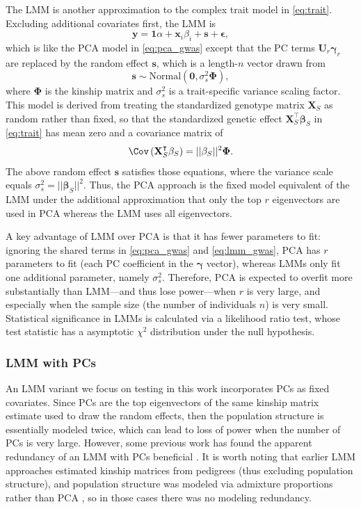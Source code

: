 \documentclass[11pt]{article}
\begin{document}
The LMM is another approximation to the complex trait model in \cref{eq:trait}.
Excluding additional covariates first, the LMM is
\begin{equation}
  \label{eq:lmm_gwas}
  \mathbf{y}
  =
  \mathbf{1} \alpha + \mathbf{x}_i \beta_i + \mathbf{s} + \mathbf{\epsilon}
  ,
\end{equation}
which is like the PCA model in \cref{eq:pca_gwas} except that the PC terms $\mathbf{U}_r \mathbf{\gamma}_r$ are replaced by the random effect $\mathbf{s}$, which is a length-$n$ vector drawn from
$$
\mathbf{s} \sim \text{Normal} \left( \mathbf{0}, \sigma^2_s \mathbf{\Phi} \right),
$$
where $\mathbf{\Phi}$ is the kinship matrix and $\sigma^2_s$ is a trait-specific variance scaling factor.
This model is derived from treating the standardized genotype matrix $\mathbf{X}_S$ as random rather than fixed, so that the standardized genetic effect
$\mathbf{X}_S^\intercal \mathbf{\beta}_S$
in \cref{eq:trait} has mean zero and a covariance matrix of
$$
\Cov \left( \mathbf{X}_S^\intercal \mathbf{\beta}_S \right)
=
|| \mathbf{\beta}_S ||^2 \mathbf{\Phi}
.
$$
The above random effect $\mathbf{s}$ satisfies those equations, where the variance scale equals $\sigma^2_s = || \mathbf{\beta}_S ||^2$.
Thus, the PCA approach is the fixed model equivalent of the LMM under the additional approximation that only the top $r$ eigenvectors are used in PCA whereas the LMM uses all eigenvectors.

A key advantage of LMM over PCA is that it has fewer parameters to fit: ignoring the shared terms in \cref{eq:pca_gwas} and \cref{eq:lmm_gwas}, PCA has $r$ parameters to fit (each PC coefficient in the $\mathbf{\gamma}$ vector), whereas LMMs only fit one additional parameter, namely $\sigma^2_s$.
Therefore, PCA is expected to overfit more substantially than LMM---and thus lose power---when $r$ is very large, and especially when the sample size (the number of individuals $n$) is very small.
Statistical significance in LMMs is calculated via a likelihood ratio test, whose test statistic has a asymptotic $\chi^2$ distribution under the null hypothesis.

\subsubsection{LMM with PCs}

An LMM variant we focus on testing in this work incorporates PCs as fixed covariates.
Since PCs are the top eigenvectors of the same kinship matrix estimate used to draw the random effects, then the population structure is essentially modeled twice, which can lead to loss of power when the number of PCs is very large.
However, some previous work has found the apparent redundancy of an LMM with PCs beneficial \citep{zhao_arabidopsis_2007, price_new_2010}.
It is worth noting that earlier LMM approaches estimated kinship matrices from pedigrees (thus excluding population structure), and population structure was modeled via admixture proportions rather than PCA \citep{yu_unified_2006, zhao_arabidopsis_2007}, so in those cases there was no modeling redundancy.
\end{document}
